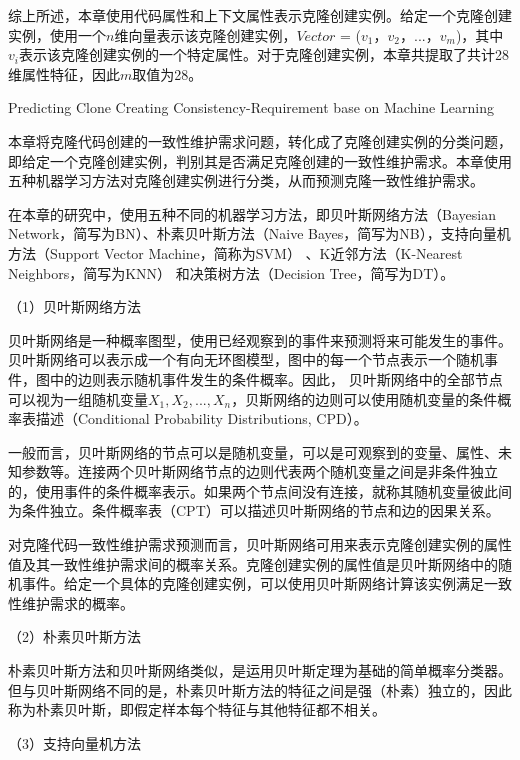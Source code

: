 综上所述，本章使用代码属性和上下文属性表示克隆创建实例。给定一个克隆创建实例，使用一个$n$维向量表示该克隆创建实例，{$Vector$ = {($v_1$，$v_2$，$...$，$v_m$)}}，其中$v_i$表示该克隆创建实例的一个特定属性。对于克隆创建实例，本章共提取了共计28维属性特征，因此$m$取值为28。
%

{Predicting Clone Creating Consistency-Requirement base on Machine Learning}
\label{lab-machine}

本章将克隆代码创建的一致性维护需求问题，转化成了克隆创建实例的分类问题，即给定一个克隆创建实例，判别其是否满足克隆创建的一致性维护需求。本章使用五种机器学习方法对克隆创建实例进行分类，从而预测克隆一致性维护需求。

在本章的研究中，使用五种不同的机器学习方法，即贝叶斯网络方法（Bayesian Network，简写为BN）\cite{friedman1997bayesian,pearl1985bayesian}、朴素贝叶斯方法（Naive Bayes，简写为NB）\cite{john1995estimating}，支持向量机方法（Support Vector Machine，简称为SVM）\cite{platt199912} 、K近邻方法（K-Nearest Neighbors，简写为KNN） \cite{aha1991instance}和决策树方法（Decision Tree，简写为DT）\cite{quinlan2014c4}。

（1）贝叶斯网络方法

贝叶斯网络是一种概率图型，使用已经观察到的事件来预测将来可能发生的事件\cite{friedman1997bayesian}。贝叶斯网络可以表示成一个有向无环图模型，图中的每一个节点表示一个随机事件，图中的边则表示随机事件发生的条件概率。因此， 贝叶斯网络中的全部节点可以视为一组随机变量{$X_{1},X_{2},...,X_{n}$}，贝斯网络的边则可以使用随机变量的条件概率表描述（Conditional Probability Distributions, CPD）。

一般而言，贝叶斯网络的节点可以是随机变量，可以是可观察到的变量、属性、未知参数等。连接两个贝叶斯网络节点的边则代表两个随机变量之间是非条件独立的，使用事件的条件概率表示。如果两个节点间没有连接，就称其随机变量彼此间为条件独立。条件概率表（CPT）可以描述贝叶斯网络的节点和边的因果关系。

对克隆代码一致性维护需求预测而言，贝叶斯网络可用来表示克隆创建实例的属性值及其一致性维护需求间的概率关系。克隆创建实例的属性值是贝叶斯网络中的随机事件。给定一个具体的克隆创建实例，可以使用贝叶斯网络计算该实例满足一致性维护需求的概率。

（2）朴素贝叶斯方法

朴素贝叶斯方法和贝叶斯网络类似，是运用贝叶斯定理为基础的简单概率分类器。但与贝叶斯网络不同的是，朴素贝叶斯方法的特征之间是强（朴素）独立的，因此称为朴素贝叶斯，即假定样本每个特征与其他特征都不相关。 

（3）支持向量机方法


